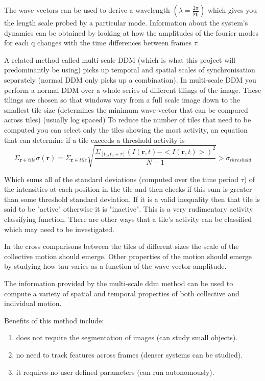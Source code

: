 \documentclass[11pt]{article}
\begin{document}
The wave-vectors can be used to derive a wavelength $(\lambda = \frac{2\pi}{|\textbf{q}|})$ which gives you the length scale probed by a particular mode.
Information about the system's dynamics can be obtained by looking at how the amplitudes of the fourier modes for each q changes with the time differences between frames $\tau$.\cite{ddm2}

A related method called multi-scale DDM (which is what this project will predominantly be using) picks up temporal and spatial scales of synchronisation separately (normal DDM only picks up a combination).
In multi-scale DDM you perform a normal DDM over a whole series of different tilings of the image.\cite{ddm1}
These tilings are chosen so that windows vary from a full scale image down to the smallest tile size (determines the minimum wave-vector that can be compared across tiles) (usually log spaced)\cite{ddm1}
To reduce the number of tiles that need to be computed you can select only the tiles showing the most activity, an equation that can determine if a tile exceeds a threshold activity is
\begin{equation}
    \Sigma_{\textbf{r} \in tile} \sigma(\textbf{r}) = \Sigma_{\textbf{r} \in tile} \sqrt{\frac{\Sigma_{[t_0, t_0 + \tau]} (I(\mathbf{r}, t) - <I(\mathbf{r}, t)>)^2}{N - 1}} > \sigma_{threshold}
\end{equation}

Which sums all of the standard deviations (computed over the time period $\tau$) of the intensities at each position in the tile and then checks if this sum is greater than some threshold standard deviation.
If it is a valid inequality then that tile is said to be "active" otherwise it is "inactive".\cite{ddm2}
This is a very rudimentary activity classifying function.
There are other ways that a tile's activity can be classified which may need to be investigated.

In the cross comparisons between the tiles of different sizes the scale of the collective motion should emerge.\cite{ddm1}
Other properties of the motion should emerge by studying how tau varies as a function of the wave-vector amplitude.\cite{ddm1}

The information provided by the multi-scale ddm method can be used to compute a variety of spatial and temporal properties of both collective and individual motion.\cite{ddm1}\cite{ddm2}

Benefits of this method include:
\begin {enumerate}
 \item does not require the segmentation of images (can study small objects).
 \item no need to track features across frames (denser systems can be studied).
 \item it requires no user defined parameters (can run autonomously).
\end{enumerate}\cite{ddm1}
\end{document}
